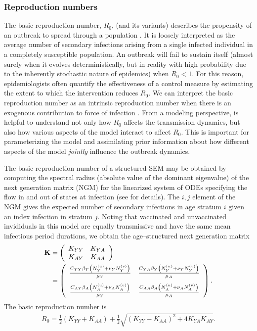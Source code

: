 \subsubsection{Reproduction numbers}
\label{subsubsec:stratmod_repnumbs}
The basic reproduction number, $ R_0 $, (and its variants) describes the propensity of an outbreak to spread through a population \cite{heffernan2005perspectives,van2008further}. It is loosely interpreted as the average number of secondary infections arising from a single infected individual in a completely susceptible population. An outbreak will fail to sustain itself (almost surely when it evolves deterministically, but in reality with high probability due to the inherently stochastic nature of epidemics) when $ R_0 < 1 $. For this reason, epidemiologists often quantify the effectiveness of a control measure by estimating the extent to which the intervention reduces $ R_0 $. We can interpret the basic reproduction number as an intrinsic reproduction number when there is an exogenous contribution to force of infection \cite{blackwood2018introduction}. From a modeling perspective, is helpful to understand not only how $ R_0 $ affects the transmission dynamics, but also how various aspects of the model interact to affect $ R_0 $. This is important for parameterizing the model and assimilating prior information about how different aspects of the model \textit{jointly} influence the outbreak dynamics.

The basic reproduction number of a structured SEM may be obtained by computing the spectral radius (absolute value of the dominant eigenvalue) of the next generation matrix (NGM) for the linearized system of ODEs specifying the flow in and out of states at infection (see \cite{heffernan2005perspectives,van2008further,van2017reproduction} for details). The $ i,j $ element of the NGM gives the expected number of secondary infections in age stratum $ i $ given an index infection in stratum $ j $. Noting that vaccinated and unvaccinated invididuals in this model are equally transmissive and have the same mean infectious period durations, we obtain the age--structured next generation matrix
\begin{align}
\label{eqn:sirs_ngm_full}
\mathbf{K} &= 
	\left (
	\begin{array}{cc}
	K_{YY} & K_{YA} \\
	K_{AY} & K_{AA}
	\end{array}
	\right ) \nonumber\\
	&=\left (
	\begin{array}{cc}
	\frac{C_{YY}\beta_Y\left (N_Y^{(u)} + \nu_YN_Y^{(v)}\right )}{\mu_Y} & \frac{C_{YA}\beta_Y\left (N_Y^{(u)} + \nu_YN_Y^{(v)}\right )}{\mu_A} \\[2ex]
	\frac{C_{AY}\beta_A\left (N_A^{(u)} + \nu_AN_A^{(v)}\right )}{\mu_Y} & \frac{C_{AA}\beta_A\left (N_A^{(u)} + \nu_AN_A^{(v)}\right )}{\mu_A}
	\end{array}
	\right ).
\end{align}
The basic reproduction number is 
\begin{align}
\label{eqn:sirs_R0}
R_0 = \frac{1}{2}\left (K_{YY} + K_{AA}\right ) + \frac{1}{2}\sqrt{(K_{YY} - K_{AA})^2 + 4K_{YA}K_{AY}}.
\end{align}

